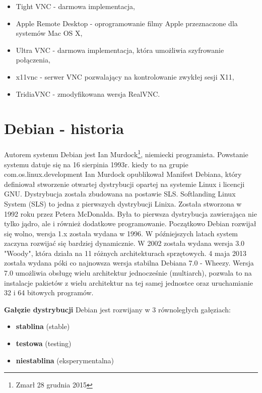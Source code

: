 \begin{itemize}
	\item Tight VNC - darmowa implementacja, 
	\item Apple Remote Desktop - oprogramowanie filmy Apple przeznaczone dla systemów Mac OS X,
	\item Ultra VNC - darmowa implementacja, która umożliwia szyfrowanie połączenia,
	\item x11vnc - serwer VNC pozwalający na kontrolowanie zwykłej sesji X11,
	\item TridiaVNC - zmodyfikowana wersja RealVNC.
\end{itemize}


\section{Debian - historia}

Autorem systemu Debian jest Ian Murdock\footnote{Zmarł 28 grudnia 2015}, niemiecki programista. Powstanie systemu datuje się na 16 sierpinia 1993r. kiedy to na grupie com.os.linux.\linebreak development Ian Murdock opublikował Manifest Debiana, który definiował stworzenie otwartej dystrybucji opartej na systemie Linux i licencji GNU. Dystrybucja została zbudowana na postawie SLS. Softlanding Linux System (SLS) to jedna z pierwszych dystrybucji Linixa. Została stworzona w 1992 roku przez Petera McDonalda. Była to pierwsza dystrybucja zawierająca nie tylko jądro, ale i również dodatkowe programowanie. Początkowo Debian rozwijał się wolno, wersja 1.x została wydana w 1996. W późniejszych latach system zaczyna rozwijać się bardziej dynamicznie. W 2002 została wydana wersja 3.0 "Woody", która działa na 11 różnych architekturach sprzętowych. 4 maja 2013 została wydana póki co najnowsza wersja stabilna Debiana 7.0 - Wheezy. Wersja 7.0 umożliwia obsługę wielu architektur jednocześnie (multiarch), pozwala to na instalacje pakietów z wielu architektur na tej samej jednostce oraz uruchamianie 32 i 64 bitowych programów. 

\textbf{Gałęzie dystrybucji}
\newline
Debian jest rozwijany w 3 równoległych gałęziach:

\begin{itemize}
	\item \textbf{stablina} (stable)
	\item \textbf{testowa} (testing)
	\item \textbf{niestablina} (eksperymentalna)
\end{itemize}

